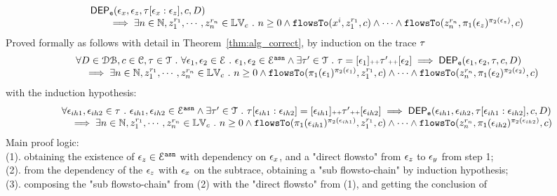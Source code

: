 %
\[
  \begin{array}{l}
    \mathsf{DEP_{\mathtt{e}}}(\mathtt{\epsilon}_x, \mathtt{\epsilon}_z, \mathtt{\tau}[\mathtt{\epsilon}_x: \mathtt{\epsilon}_z], c, D)
    \\ \qquad 
    \implies 
    \exists n \in \mathbb{N}, z_1^{r_1}, \cdots, z_n^{r_n} \in \mathbb{LV}_{{c}} ~.~ n \geq 0 \land
\mathtt{flowsTo}(x^i,  z_1^{r_1}, c) 
\land \cdots \land \mathtt{flowsTo}(z_n^{r_n},  \pi_1(\mathtt{\epsilon}_z)^{\pi_2(\mathtt{\epsilon}_z)}, c)
\end{array}
\]
%
Proved formally as follows with detail in Theorem~\ref{thm:alg_correct}, by induction on the trace $\mathtt{\tau}$
%
\[
  \begin{array}{l}
		\forall D \in \mathcal{DB} , c \in \mathcal{C}, \mathtt{\tau} \in \mathcal{T} ~.~ \forall \mathtt{\epsilon}_1, \mathtt{\epsilon}_2 \in \mathcal{E} ~.~
    \mathtt{\epsilon}_1, \mathtt{\epsilon}_2 \in \mathcal{E}^{\mathtt{{asn}}} \land 
		 \exists \mathtt{\tau}' \in \mathcal{T} ~.~ \mathtt{\tau} = [\mathtt{\epsilon}_1] {\scriptscriptstyle ++} \mathtt{\tau}' {\scriptscriptstyle ++} [\mathtt{\epsilon}_2]
		\implies
		\mathsf{DEP_{\mathtt{e}}}(\mathtt{\epsilon}_1, \mathtt{\epsilon}_2, \mathtt{\tau}, c, D) 
		\\ \quad 
		\implies 
    \exists n \in \mathbb{N}, z_1^{r_1}, \cdots, z_n^{r_n} \in \mathbb{LV}_{{c}} ~.~ n \geq 0 \land
		\mathtt{flowsTo}(\pi_1(\mathtt{\epsilon}_1)^{\pi_2(\mathtt{\epsilon}_1)},  z_1^{r_1}, c) 
    \land \cdots \land \mathtt{flowsTo}(z_n^{r_n}, \pi_1(\mathtt{\epsilon}_2)^{\pi_2(\mathtt{\epsilon}_2)}, c) 
	\end{array}
\]
with the induction hypothesis:
\[
  \begin{array}{l}
    \forall \mathtt{\epsilon}_{ih1}, \mathtt{\epsilon}_{ih2} \in \mathtt{\tau} ~.~ \mathtt{\epsilon}_{ih1}, \mathtt{\epsilon}_{ih2} \in \mathcal{E}^{\mathtt{{asn}}} 
    \land
		 \exists \mathtt{\tau}' \in \mathcal{T} ~.~ 
     \mathtt{\tau}[\mathtt{\epsilon}_{ih1}:\mathtt{\epsilon}_{ih2}] = [\mathtt{\epsilon}_{ih1}] {\scriptscriptstyle ++} \mathtt{\tau}' {\scriptscriptstyle ++} [\mathtt{\epsilon}_{ih2}]
		\implies
		\mathsf{DEP_{\mathtt{e}}}(\mathtt{\epsilon}_{ih1}, \mathtt{\epsilon}_{ih2}, \mathtt{\tau}[\mathtt{\epsilon}_{ih1}:\mathtt{\epsilon}_{ih2}], c, D) 
		\\ \quad 
		\implies 
    \exists n \in \mathbb{N}, z_1^{r_1}, \cdots, z_n^{r_n} \in \mathbb{LV}_{{c}} ~.~ n \geq 0 \land
		\mathtt{flowsTo}(\pi_1(\mathtt{\epsilon}_{ih1})^{\pi_2(\mathtt{\epsilon}_{ih1})},  z_1^{r_1}, c) 
    \land \cdots \land \mathtt{flowsTo}(z_n^{r_n}, \pi_1(\mathtt{\epsilon}_{ih2})^{\pi_2(\mathtt{\epsilon}_{ih2})}, c) 
  \end{array}
  \]
%
Main proof logic:
\\
(1). obtaining the existence of $\mathtt{\epsilon}_z \in \mathcal{E}^{\mathtt{{asn}}} $ with dependency on $\mathtt{\epsilon}_x$, and a "direct flowsto" from $\mathtt{\epsilon}_z$ to $\mathtt{\epsilon}_y$
 from step 1;
 \\
(2). from the dependency of the $\mathtt{\epsilon}_z$ with $\mathtt{\epsilon}_x$ on the subtrace,
 obtaining a "sub flowsto-chain" by induction  hypothesis;
 \\
(3). composing the "sub flowsto-chain" from (2) with the  "direct flowsto" from (1), and getting the conclusion of
